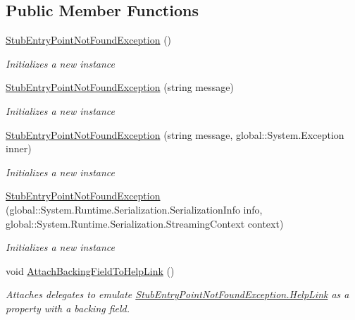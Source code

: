 \subsection*{Public Member Functions}
\begin{DoxyCompactItemize}
\item 
\hyperlink{class_system_1_1_fakes_1_1_stub_entry_point_not_found_exception_a61a4e2bb7cd02e0a6e4f6c746ce960c2}{Stub\-Entry\-Point\-Not\-Found\-Exception} ()
\begin{DoxyCompactList}\small\item\em Initializes a new instance\end{DoxyCompactList}\item 
\hyperlink{class_system_1_1_fakes_1_1_stub_entry_point_not_found_exception_a7603fcbf303ac3948cb7ebf9dbb66d86}{Stub\-Entry\-Point\-Not\-Found\-Exception} (string message)
\begin{DoxyCompactList}\small\item\em Initializes a new instance\end{DoxyCompactList}\item 
\hyperlink{class_system_1_1_fakes_1_1_stub_entry_point_not_found_exception_a2db8f775532f9fb20a8ac0729449dff7}{Stub\-Entry\-Point\-Not\-Found\-Exception} (string message, global\-::\-System.\-Exception inner)
\begin{DoxyCompactList}\small\item\em Initializes a new instance\end{DoxyCompactList}\item 
\hyperlink{class_system_1_1_fakes_1_1_stub_entry_point_not_found_exception_afc69b2533c74b69b74b878d057d7be40}{Stub\-Entry\-Point\-Not\-Found\-Exception} (global\-::\-System.\-Runtime.\-Serialization.\-Serialization\-Info info, global\-::\-System.\-Runtime.\-Serialization.\-Streaming\-Context context)
\begin{DoxyCompactList}\small\item\em Initializes a new instance\end{DoxyCompactList}\item 
void \hyperlink{class_system_1_1_fakes_1_1_stub_entry_point_not_found_exception_afaed7a176ee6a7226dd4c1c56d8406fe}{Attach\-Backing\-Field\-To\-Help\-Link} ()
\begin{DoxyCompactList}\small\item\em Attaches delegates to emulate \hyperlink{class_system_1_1_fakes_1_1_stub_entry_point_not_found_exception_a1f7108ac3cd4f91de3e6fa98fe612f52}{Stub\-Entry\-Point\-Not\-Found\-Exception.\-Help\-Link} as a property with a backing field.\end{DoxyCompactList}\item 

\end{DoxyCompactItemize}
